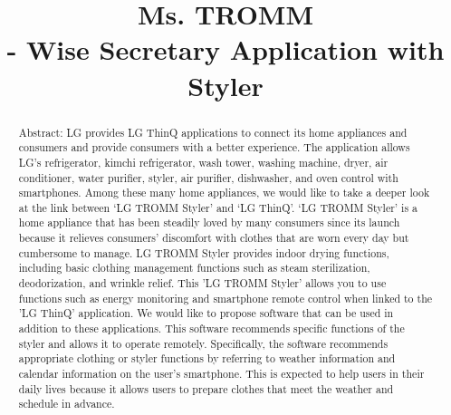 \documentclass[conference]{IEEEtran}
\begin{document}
\title{Ms. TROMM \\
- Wise Secretary Application with Styler\\
}

\author{
\and
{}
\and
{}
\and
{}
}

\maketitle

\begin{abstract}
Abstract: LG provides LG ThinQ applications to connect its home appliances and consumers and provide consumers with a better experience. The application allows LG's refrigerator, kimchi refrigerator, wash tower, washing machine, dryer, air conditioner, water purifier, styler, air purifier, dishwasher, and oven control with smartphones. Among these many home appliances, we would like to take a deeper look at the link between ‘LG TROMM Styler’ and ‘LG ThinQ’. ‘LG TROMM Styler’ is a home appliance that has been steadily loved by many consumers since its launch because it relieves consumers' discomfort with clothes that are worn every day but cumbersome to manage. LG TROMM Styler provides indoor drying functions, including basic clothing management functions such as steam sterilization, deodorization, and wrinkle relief. This 'LG TROMM Styler' allows you to use functions such as energy monitoring and smartphone remote control when linked to the 'LG ThinQ' application. We would like to propose software that can be used in addition to these applications. This software recommends specific functions of the styler and allows it to operate remotely. Specifically, the software recommends appropriate clothing or styler functions by referring to weather information and calendar information on the user's smartphone. This is expected to help users in their daily lives because it allows users to prepare clothes that meet the weather and schedule in advance.
\end{abstract}
\end{document}
